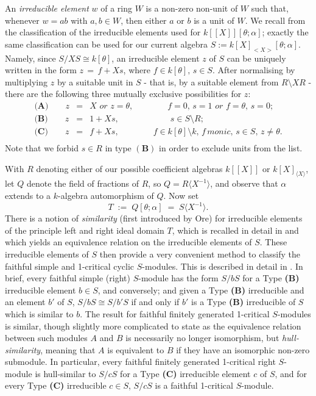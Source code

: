\documentclass[a4paper, 11pt]{article}
\theoremstyle{definition}
\begin{document}
An {\it irreducible element} $w$ of a ring $W$ is a non-zero non-unit of $W$ such that, whenever $w = ab$ with $a,b \in W$, then either $a$ or $b$ is a unit of $W$. We recall from \cite[$\S$4.2]{BCM2} the classification of the irreducible elements used for $k[[X]][\theta; \alpha]$; exactly the same classification can be used for our current algebra $S := k[X]_{<X>}[\theta; \alpha]$. Namely, since $ S/X S \cong k[\theta]$, an irreducible element $z$ of $ S$ can be uniquely written in the form $ z \, =\,  f + Xs$, where $f \in k[\theta], \, s \in  S.$ After normalising by multiplying $z$ by a suitable unit in $ S$ - that is, by a suitable element from $ R \setminus X R$ - there are the following three mutually exclusive possibilities for $z$:
\begin{eqnarray*}
\textbf{(A)} \qquad z &=& X \textit{ or } z = \theta, \qquad \qquad f
= 0, \, s = 1 \textit{ or } f= \theta, \, s= 0; \\
\textbf{(B)} \qquad z &=& 1 + Xs, \qquad \qquad \qquad s \in  S\setminus  R;\\
\textbf{(C)} \qquad z &=& f + Xs, \qquad \qquad f \in k[\theta]\setminus k,\, f \, \textit{monic}, \, s \in  S, \, z \neq \theta.\\
\end{eqnarray*}
\noindent Note that we forbid $s \in  R$ in type $(\mathbf{B})$ in order to exclude units from the list. 

With $R$ denoting either of our possible coefficient algebras $k[[X]]$ or $k[X]_{\langle X \rangle}$, let $Q$ denote the field of fractions of $R$, so $Q = R\langle X^{-1}\rangle$, and observe that $\alpha$ extends to a $k$-algebra automorphism of $Q$. Now  set 
$$T \; := \; Q[\theta;\alpha] \; = \; S\langle X^{-1}\rangle. $$
There is a notion of {\it similarity} (first introduced by Ore) for irreducible elements of the principle left and right ideal domain $T$, which is recalled in detail in \cite[Definition 5.3, Theorem 5.4]{BCM2} and which yields an equivalence relation on the irreducible elements of $S$. These irreducible elements of $S$ then provide a very convenient method to classify the faithful simple and 1-critical cyclic $S$-modules. This is described in detail in \cite[Theorems 5.5 and 5.10]{BCM2}. In brief, every faithful simple (right) $S$-module has the form $S/bS$ for a Type {\bf (B)} irreducible element $b \in S$, and conversely; and given a Type {\bf (B)} irreducible and an element $b'$ of $S$, $S/bS \cong S/b'S$ if and only if $b'$ is a Type {\bf (B)} irreducible of $S$ which is similar to $b$. The result for faithful finitely generated 1-critical $S$-modules is similar, though slightly more complicated to state as the equivalence relation between such modules $A$ and $B$ is necessarily no longer isomorphism, but {\it hull-similarity}, meaning that $A$ is equivalent to $B$ if they have an isomorphic non-zero submodule. In particular, every faithful finitely generated 1-critical right $S$-module is hull-similar to $S/cS$ for a Type {\bf (C)} irreducible element $c$ of $S$, and for every Type {\bf (C)} irreducible $c \in S$, $S/cS$ is a faithful 1-critical $S$-module.
\end{document}
